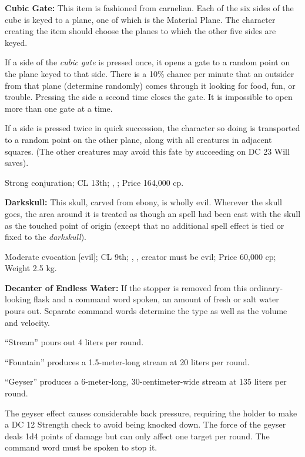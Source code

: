 \textbf{Cubic Gate:} This item is fashioned from carnelian. Each of the six sides of the cube is keyed to a plane, one of which is the Material Plane. The character creating the item should choose the planes to which the other five sides are keyed.

If a side of the \emph{cubic gate} is pressed once, it opens a gate to a random point on the plane keyed to that side. There is a 10\% chance per minute that an outsider from that plane (determine randomly) comes through it looking for food, fun, or trouble. Pressing the side a second time closes the gate. It is impossible to open more than one gate at a time.

If a side is pressed twice in quick succession, the character so doing is transported to a random point on the other plane, along with all creatures in adjacent squares. (The other creatures may avoid this fate by succeeding on DC 23 Will saves).

Strong conjuration; CL 13th; , ; Price 164,000 cp.



\textbf{Darkskull:} This skull, carved from ebony, is wholly evil. Wherever the skull goes, the area around it is treated as though an  spell had been cast with the skull as the touched point of origin (except that no additional spell effect is tied or fixed to the \emph{darkskull}).

Moderate evocation [evil]; CL 9th; , , creator must be evil; Price 60,000 cp; Weight 2.5 kg.



\textbf{Decanter of Endless Water:} If the stopper is removed from this ordinary-looking flask and a command word spoken, an amount of fresh or salt water pours out. Separate command words determine the type as well as the volume and velocity.

\begin{itemize*}
\item ``Stream'' pours out 4 liters per round.
\item ``Fountain'' produces a 1.5-meter-long stream at 20 liters per round.
\item ``Geyser'' produces a 6-meter-long, 30-centimeter-wide stream at 135 liters per round.
\end{itemize*}

The geyser effect causes considerable back pressure, requiring the holder to make a DC 12 Strength check to avoid being knocked down. The force of the geyser deals 1d4 points of damage but can only affect one target per round. The command word must be spoken to stop it.

